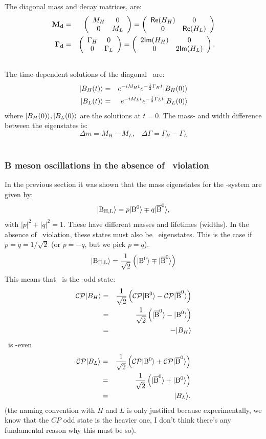 The diagonal mass and decay matrices,
 are:
\begin{eqnarray}
\mathbf{M_d}&=& \left( \begin{array}{cc} M_H & 0 \\ 0 & M_L \end{array} \right)
        = \left( \begin{array}{cc} \mathsf{Re}\!\left(H_H\right) & 0 \\ 0 & \mathsf{Re}\!\left(H_L\right) \end{array} \right)\\
\mathbf{\Gamma_d}&=& \left( \begin{array}{cc} \Gamma_H & 0 \\ 0 & \Gamma_L \end{array} \right) 
             = \left( \begin{array}{cc} 2\mathsf{Im}\!\left(H_H\right) & 0 \\ 0 & 2\mathsf{Im}\!\left(H_L\right) \end{array} \right)
.
\nonumber\\
\mbox{}
\end{eqnarray}
 The time-dependent solutions of the diagonal \Se\ are:
 \begin{eqnarray}
  | B_H(t) \rangle &=& e^{-iM_Ht} e^{-\frac{1}{2}\Gamma_Ht}  | B_H(0) \rangle \nonumber\\
  | B_L(t) \rangle &=& e^{-iM_Lt} e^{-\frac{1}{2}\Gamma_Lt}  | B_L(0) \rangle \nonumber\\
 \end{eqnarray}
 where $ | B_H(0) \rangle,  | B_L(0) \rangle$ are the solutions at $t=0$.
 The mass- and width difference between the eigenstates is:
\begin{equation}
\Delta\!m = M_H-M_L, \;\;\;
\Delta\!\Gamma=\Gamma_H-\Gamma_L
\end{equation}\\

\subsubsection{B meson oscillations in the absence of \cp\ violation}
\label{sec:bosc}
 In the previous section it was shown that the mass eigenstates
 for the \Bo-system are given by:
\begin{equation}
\label{eq:th.a.def_Bl_Bh}
 | {\rm B_{H,L}} \rangle = p  | {\rm B^0} \rangle \mp q  | {\rm \overline{B}^0} \rangle,
\end{equation}
with $|p|^2 + |q|^2 = 1$. 
These have different masses and lifetimes (widths). In the absence of \cp\ violation, these states must also be \cp\  eigenstates. This is the case if $p=q=1/\sqrt{2}$ (or $p=-q$, but we pick $p=q$). 
\begin{equation}
\label{eq:th.a.def_Bl_Bh}
 | {\rm B_{H,L}} \rangle = \frac{1}{\sqrt{2}} \left(  | {\rm B^0} \rangle \mp  | {\rm \overline{B}^0} \rangle\right)
\end{equation}
This means that \Bh\ is the \cp-odd state:
\begin{eqnarray}
\mathcal{CP}  | B_H \rangle & = & \frac{1}{\sqrt{2}} \left( \mathcal{CP}  | {\rm B^0} \rangle - \mathcal{CP}  | {\rm \overline{B}^0} \rangle\right) \nonumber\\
& = & \frac{1}{\sqrt{2}} \left(  | {\rm \overline{B}^0} \rangle -  | {\rm B^0} \rangle\right) \nonumber\\
& = & -  | B_H \rangle
\end{eqnarray}
\Bl\ is \cp-even
\begin{eqnarray}
\mathcal{CP}  | B_L \rangle & = & \frac{1}{\sqrt{2}} \left( \mathcal{CP}  | {\rm B^0} \rangle + \mathcal{CP}  | {\rm \overline{B}^0} \rangle\right) \nonumber\\
& = & \frac{1}{\sqrt{2}} \left(  | {\rm \overline{B}^0} \rangle +  | {\rm B^0} \rangle\right) \nonumber\\
& = &  | B_L \rangle.
\end{eqnarray}
(the naming convention with $H$ and $L$ is only justified because experimentally, we know that the $CP$ odd state is the heavier one, I don't think there's any fundamental reason why this must be so).

